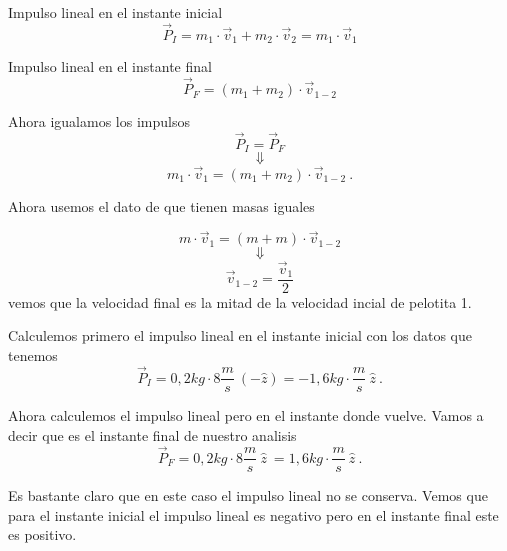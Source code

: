 \documentclass[../Main.tex]{subfiles}
\begin{document}
{
    Impulso lineal en el instante inicial
    \begin{equation*}
        \vec{P} _I = m_1 \cdot \vec{v} _1 + m_2 \cdot \vec{v} _2 = m_1 \cdot \vec{v} _1 
    \end{equation*}

    Impulso lineal en el instante final
    \begin{equation*}
        \vec{P} _F = (m_1 + m_2) \cdot \vec{v} _{1-2}
    \end{equation*}

    Ahora igualamos los impulsos
    \begin{equation*}
        \vec{P} _I = \vec{P} _F
    \end{equation*}
    \begin{equation*}
        \Downarrow
    \end{equation*}
    \begin{equation*}
        m_1 \cdot \vec{v} _1 = (m_1 + m_2) \cdot \vec{v} _{1-2} \ .
    \end{equation*}

    Ahora usemos el dato de que tienen masas iguales

    \begin{equation*}
        m \cdot \vec{v} _1 = (m + m) \cdot \vec{v} _{1-2}
    \end{equation*}
    \begin{equation*}
        \Downarrow
    \end{equation*}
    \begin{equation*}
        \vec{v} _{1-2} = \frac{\vec{v} _1}{2}
    \end{equation*}
    vemos que la velocidad final es la mitad de la velocidad incial de pelotita 1.


    Calculemos primero el impulso lineal en el instante inicial con los datos que
    tenemos
    \begin{equation*}
        \vec{P} _{I} = 0,2 kg \cdot 8 \frac{m}{s} \ ( - \hat{z} ) = - 1,6 kg \cdot \frac{m}{s} \ \hat{z} \ .
    \end{equation*}

    Ahora calculemos el impulso lineal pero en el instante donde vuelve. Vamos a
    decir que es el instante final de nuestro analisis
    \begin{equation*}
        \vec{P} _{F} = 0,2 kg \cdot 8 \frac{m}{s} \ \hat{z} \ = 1,6 kg \cdot \frac{m}{s} \ \hat{z} \ .
    \end{equation*}

    Es bastante claro que en este caso el impulso lineal no se conserva. Vemos que
    para el instante inicial el impulso lineal es negativo pero en el instante
    final este es positivo.

}
\end{document}

